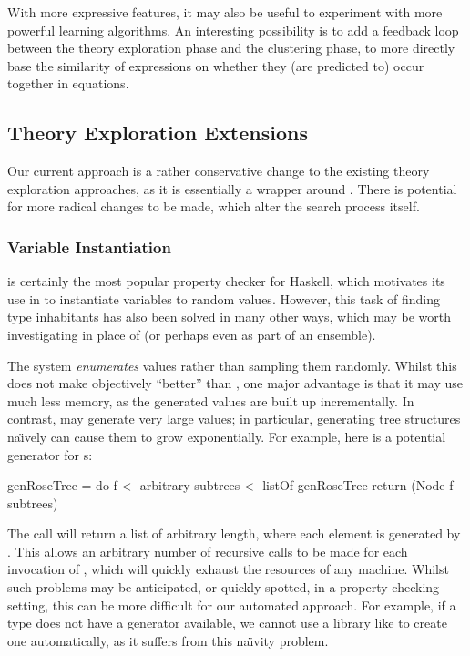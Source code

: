 With more expressive features, it may also be useful to experiment with more
powerful learning algorithms. An interesting possibility is to add a feedback
loop between the theory exploration phase and the clustering phase, to more
directly base the similarity of expressions on whether they (are predicted to)
occur together in equations.

\subsection{Theory Exploration Extensions}

Our current approach is a rather conservative change to the existing theory
exploration approaches, as it is essentially a wrapper around \quickspec{}.
There is potential for more radical changes to be made, which alter the search
process itself.

\subsubsection{Variable Instantiation}

\quickcheck{} is certainly the most popular property checker for Haskell, which
motivates its use in \quickspec{} to instantiate variables to random
values. However, this task of finding type inhabitants has also been solved in
many other ways, which may be worth investigating in place of \quickcheck{} (or
perhaps even as part of an ensemble).

The \smallcheck{} system \cite{runciman2008smallcheck} \emph{enumerates}
values rather than sampling them randomly. Whilst this does not make
\smallcheck{} objectively ``better'' than \quickcheck{}, one major advantage
is that it may use much less memory, as the generated values are built up
incrementally. In contrast, \quickcheck{} may generate very large values; in
particular, generating tree structures na\"{\i}vely can cause them to grow
exponentially. For example, here is a potential generator for s:

\begin{haskell}
genRoseTree = do f        <- arbitrary
                 subtrees <- listOf genRoseTree
                 return (Node f subtrees)
\end{haskell}

The  call will return a list of arbitrary length, where
each element is generated by . This allows an arbitrary number
of recursive calls to be made for each invocation of , which
will quickly exhaust the resources of any machine. Whilst such problems may be
anticipated, or quickly spotted, in a property checking setting, this can be
more difficult for our automated approach. For example, if a type does not have
a generator available, we cannot use a library like  to create one
automatically, as it suffers from this na\"{\i}vity problem.


